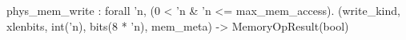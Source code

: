 phys_mem_write : forall 'n, (0 < 'n & 'n <= max_mem_access).
  (write_kind, xlenbits, int('n), bits(8 * 'n), mem_meta) -> MemoryOpResult(bool)